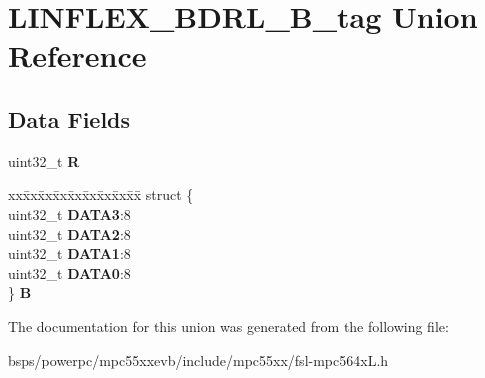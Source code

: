 \hypertarget{unionLINFLEX__BDRL__32B__tag}{}\section{L\+I\+N\+F\+L\+E\+X\+\_\+\+B\+D\+R\+L\+\_\+B\+\_\+tag Union Reference}
\label{unionLINFLEX__BDRL__32B__tag}
\subsection*{Data Fields}
\begin{DoxyCompactItemize}
\item 
\mbox{\label{unionLINFLEX__BDRL__32B__tag_af22e06037434fb4151b08d2eeaeec110}} 
uint32\+\_\+t {\bfseries R}
\item 
\mbox{\label{unionLINFLEX__BDRL__32B__tag_a8eb31f293e0eac455bea6a0f07c2480c}} 
\begin{tabbing}
xx\=xx\=xx\=xx\=xx\=xx\=xx\=xx\=xx\=\kill
struct \{\\
\>uint32\_t {\bfseries DATA3}:8\\
\>uint32\_t {\bfseries DATA2}:8\\
\>uint32\_t {\bfseries DATA1}:8\\
\>uint32\_t {\bfseries DATA0}:8\\
\} {\bfseries B}\\

\end{tabbing}\end{DoxyCompactItemize}


The documentation for this union was generated from the following file\+:\begin{DoxyCompactItemize}
\item 
bsps/powerpc/mpc55xxevb/include/mpc55xx/fsl-\/mpc564x\+L.\+h\end{DoxyCompactItemize}
